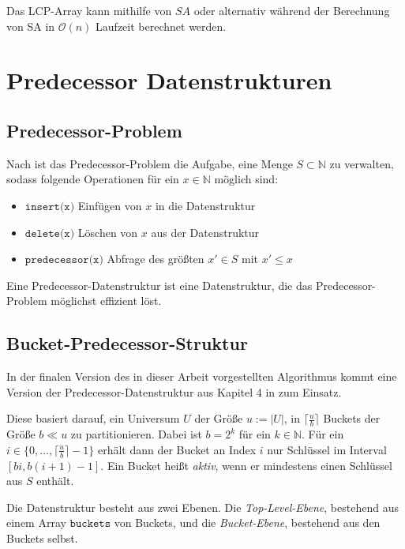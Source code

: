 Das LCP-Array kann mithilfe von $SA$ \cite{kasai_linear-time_2001} oder alternativ während der Berechnung von SA \cite{fischer_inducing_2011} in $\mathcal{O}(n)$ Laufzeit berechnet werden.

\section{Predecessor Datenstrukturen}

\subsection{Predecessor-Problem}

Nach \cite{dinklage_engineering_2021} ist das Predecessor-Problem die Aufgabe, eine Menge $S \subset \mathbb{N}$ zu verwalten, sodass folgende Operationen für ein $x \in \mathbb{N}$ möglich sind:

\begin{itemize}
	\item $\texttt{insert(x)}$ Einfügen von $x$ in die Datenstruktur
	\item $\texttt{delete(x)}$ Löschen von $x$ aus der Datenstruktur
	\item $\texttt{predecessor(x)}$ Abfrage des größten $x' \in S$ mit $x' \leq x$
\end{itemize}

Eine Predecessor-Datenstruktur ist eine Datenstruktur, die das Predecessor-Problem möglichst effizient löst.

\subsection{Bucket-Predecessor-Struktur}

In der finalen Version des in dieser Arbeit vorgestellten Algorithmus kommt eine Version der Predecessor-Datenstruktur aus Kapitel 4 in \cite{dinklage_engineering_2021} zum Einsatz.

Diese basiert darauf, ein Universum $U$ der Größe $u := |U|$, in $\lceil \tfrac{u}{b} \rceil$ Buckets der Größe $b \ll u$ zu partitionieren. Dabei ist $b = 2^k$ für ein $k \in \mathbb{N}$. Für ein $i \in \{0, \dots, \lceil \tfrac{u}{b} \rceil - 1 \}$ erhält dann der Bucket an Index $i$ nur Schlüssel im Interval $[bi, b(i + 1) - 1]$. Ein Bucket heißt \emph{aktiv}, wenn er mindestens einen Schlüssel aus $S$ enthält.

Die Datenstruktur besteht aus zwei Ebenen. Die \emph{Top-Level-Ebene}, bestehend aus einem Array $\texttt{buckets}$ von Buckets, und die \emph{Bucket-Ebene}, bestehend aus den Buckets selbst.

